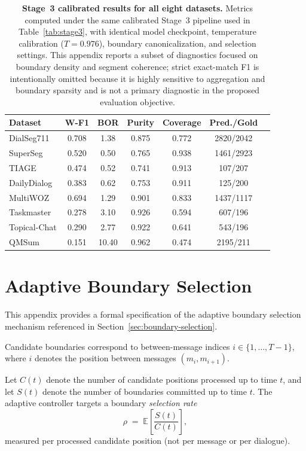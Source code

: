 \begin{table}[t]
  \centering
  \small
  \begin{tabular}{lcccccc}
    \toprule
    Dataset & W-F1 & BOR & Purity & Coverage & Pred./Gold \\
    \midrule
    DialSeg711    & 0.708 & 1.38  & 0.875 & 0.772 & 2820/2042 \\
    SuperSeg      & 0.520 & 0.50  & 0.765 & 0.938 & 1461/2923 \\
    TIAGE         & 0.474 & 0.52  & 0.741 & 0.913 & 107/207   \\
    DailyDialog   & 0.383 & 0.62  & 0.753 & 0.911 & 125/200   \\
    MultiWOZ      & 0.694 & 1.29  & 0.901 & 0.833 & 1437/1117 \\
    Taskmaster    & 0.278 & 3.10  & 0.926 & 0.594 & 607/196   \\
    Topical-Chat  & 0.290 & 2.77  & 0.922 & 0.641 & 543/196   \\
    QMSum         & 0.151 & 10.40 & 0.962 & 0.474 & 2195/211  \\
    \bottomrule
  \end{tabular}
  \caption{\textbf{Stage~3 calibrated results for all eight datasets.}
    Metrics computed under the same calibrated Stage~3 pipeline used in Table~\ref{tab:stage3},
    with identical model checkpoint, temperature calibration ($T=0.976$), boundary canonicalization,
    and selection settings.
    This appendix reports a subset of diagnostics focused on boundary density and segment coherence;
    strict exact-match F1 is intentionally omitted because it is highly sensitive to aggregation and
    boundary sparsity and is not a primary diagnostic in the proposed evaluation objective.}
  \label{tab:stage3-all8}
\end{table}

\section{Adaptive Boundary Selection}
\label{app:adaptive}

This appendix provides a formal specification of the adaptive boundary
selection mechanism referenced in Section~\ref{sec:boundary-selection}.

Candidate boundaries correspond to between-message indices
$i \in \{1,\ldots,T{-}1\}$, where $i$ denotes the position between messages
$(m_i, m_{i+1})$.

Let $C(t)$ denote the number of candidate positions processed up to time $t$, and
let $S(t)$ denote the number of boundaries committed up to time $t$. The adaptive
controller targets a boundary \emph{selection rate}
\[
\rho \;=\; \mathbb{E}\!\left[\frac{S(t)}{C(t)}\right],
\]
measured per processed candidate position (not per message or per dialogue).

